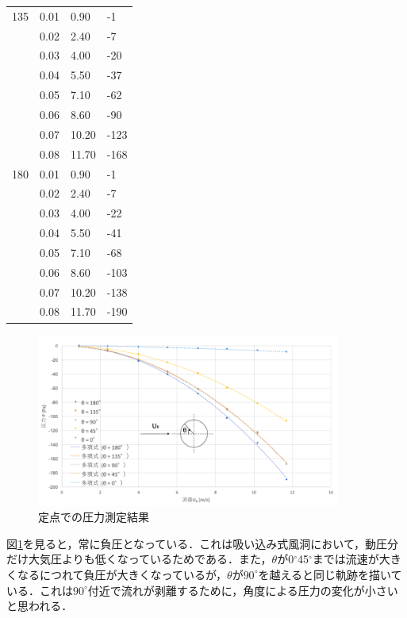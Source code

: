 \documentclass[a4paper,11pt,uplatex]{jsarticle}
\begin{document}
\begin{longtable}{llll}
135 & 0.01 & 0.90 & -1 \\ \cline{2-4}
 & 0.02 & 2.40 & -7 \\ \cline{2-4}
 & 0.03 & 4.00 & -20 \\ \cline{2-4}
 & 0.04 & 5.50 & -37 \\ \cline{2-4}
 & 0.05 & 7.10 & -62 \\ \cline{2-4}
 & 0.06 & 8.60 & -90 \\ \cline{2-4}
 & 0.07 & 10.20 & -123 \\ \cline{2-4}
 & 0.08 & 11.70 & -168 \\ \hline \hline
180 & 0.01 & 0.90 & -1 \\ \cline{2-4}
 & 0.02 & 2.40 & -7 \\ \cline{2-4}
 & 0.03 & 4.00 & -22 \\ \cline{2-4}
 & 0.04 & 5.50 & -41 \\ \cline{2-4}
 & 0.05 & 7.10 & -68 \\ \cline{2-4}
 & 0.06 & 8.60 & -103 \\ \cline{2-4}
 & 0.07 & 10.20 & -138 \\ \cline{2-4}
 & 0.08 & 11.70 & -190 \\ \cline{2-4}
\end{longtable}

\begin{figure}[H]
  \begin{center}
    \includegraphics[width = 10cm]{pic/流速と圧力2.png}
    \caption{定点での圧力測定結果}
    \label{定点測定}
  \end{center}
\end{figure}

図\ref{定点測定}を見ると，常に負圧となっている．これは吸い込み式風洞において，動圧分だけ大気圧よりも低くなっているためである．また，$\theta$が0$^\circ$45$^\circ$までは流速が大きくなるにつれて負圧が大きくなっているが，$\theta $が$90^{\circ}$を越えると同じ軌跡を描いている．これは$90^{\circ}$付近で流れが剥離するために，角度による圧力の変化が小さいと思われる．
\end{document}
